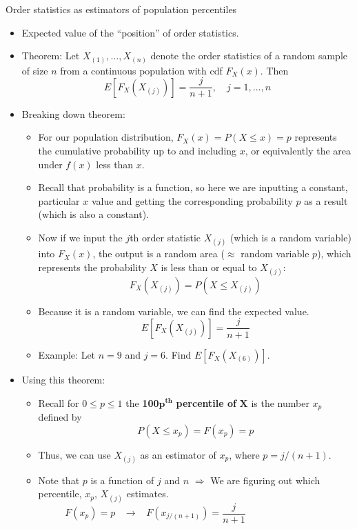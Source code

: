 \documentclass{article}
\newcommand{\order}[2]{#1_{(#2)}}		%
\begin{document}
Order statistics as estimators of population percentiles\bigskip
\begin{itemize}
    \item Expected value of the ``position'' of order statistics.
    \item[] Theorem: Let $\order{X}{1}, \ldots, \order{X}{n}$ denote the order statistics of a random sample of size $n$ from a continuous population with cdf $F_X(x)$. Then
    \[E[F_X(\order{X}{j})] = \frac{j}{n+1}, \quad j = 1, \ldots, n\]
    \item Breaking down theorem:
    \begin{itemize}
        \item For our population distribution, $F_X(x) = P(X \le x) = p$ represents the cumulative probability up to and including $x$, or equivalently the area under $f(x)$ less than $x$.\vspace{30pt}
        \item[] Recall that probability is a function, so here we are inputting a constant, particular $x$ value and getting the corresponding probability $p$ as a result (which is also a constant).
        \item Now if we input the $j$th order statistic $\order{X}{j}$ (which is a random variable) into $F_X(x)$, the output is a random area ($\approx$ random variable $p$), which represents the probability $X$ is less than or equal to $\order{X}{j}$:
        \[F_X(\order{X}{j}) = P(X \le \order{X}{j})\]
        \item Because it is a random variable, we can find the expected value.
        \[E[F_X(\order{X}{j})] = \frac{j}{n+1}\]
        \item[] Example: Let $n = 9$ and $j = 6$. Find $E[F_X(\order{X}{6})]$.\bigskip
    \end{itemize}
    \item Using this theorem:
    \begin{itemize}
        \item Recall for $0 \le p \le 1$ the \textbf{100}$\boldsymbol{p^{th}}$ \textbf{percentile of} $\boldsymbol{X}$ is the number $x_p$ defined by
        \[P(X \le x_p) = F(x_p) = p\]
        \item Thus, we can use $\order{X}{j}$ as an estimator of $x_p$, where $p = j / (n+1)$.
        \item[] Note that $p$ is a function of $j$ and $n$  $\Longrightarrow$ We are figuring out which percentile, $x_p$, $\order{X}{j}$ estimates.
        \[F(x_p) = p \hspace{10pt} \longrightarrow \hspace{10pt} F(x_{j / (n+1)}) = \frac{j}{n+1} \hspace{100pt}\]\vspace{60pt}
   \end{itemize}
\end{itemize}\bigskip
\end{document}

